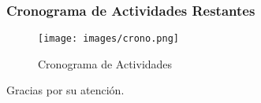 \documentclass{beamer}
\begin{document}

\begin{frame}
    \frametitle{Cronograma de Actividades Restantes}
    \begin{figure}[htbp]
        \centerline{\texttt{[image: images/crono.png]}}
        \caption{Cronograma de Actividades}
        \label{fig:crono}
    \end{figure}
\end{frame}

\begin{frame}
\begin{center}
    Gracias por su atención.
\end{center}
\end{frame}
\end{document}
